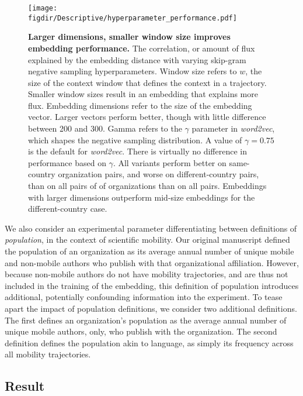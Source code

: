 \documentclass[12pt,draft,a4paper]{article}
\def\figdir{../Figs}
\begin{document}
%
%
\begin{figure}[ht!]
	\centering
	\texttt{[image: \\figdir/Descriptive/hyperparameter\_performance.pdf]}
	\caption{
		\textbf{Larger dimensions, smaller window size improves embedding performance.}
		The correlation, or amount of flux explained by the embedding distance with varying skip-gram negative sampling hyperparameters.
		Window size refers to $w$, the size of the context window that defines the context in a trajectory.
		Smaller window sizes result in an embedding that explains more flux.
		Embedding dimensions refer to the size of the embedding vector.
		Larger vectors perform better, though with little difference between 200 and 300.
		Gamma refers to the $\gamma$ parameter in \textit{word2vec}, which shapes the negative sampling distribution.
		A value of $\gamma = 0.75$ is the default for \textit{word2vec}.
		There is virtually no difference in performance based on $\gamma$.
		All variants perform better on same-country organization pairs, and worse on different-country pairs, than on all pairs of  of organizations than on all pairs.
		Embeddings with larger dimensions outperform mid-size embeddings for the different-country case.
	}

	\label{fig:supp:hyperparameter}
\end{figure}

We also consider an experimental parameter differentiating between definitions of \textit{population}, in the context of scientific mobility.
Our original manuscript defined the population of an organization as its average annual number of unique mobile and non-mobile authors who publish with that organizational affiliation.
However, because non-mobile authors do not have mobility trajectories, and are thus not included in the training of the embedding, this definition of population introduces additional, potentially confounding information into the experiment.
To tease apart the impact of population definitions, we consider two additional definitions.
The first defines an organization's population as the average annual number of unique mobile authors, only, who publish with the organization.
The second definition defines the population akin to language, as simply its frequency across all mobility trajectories.

\subsection{Result}
\end{document}
